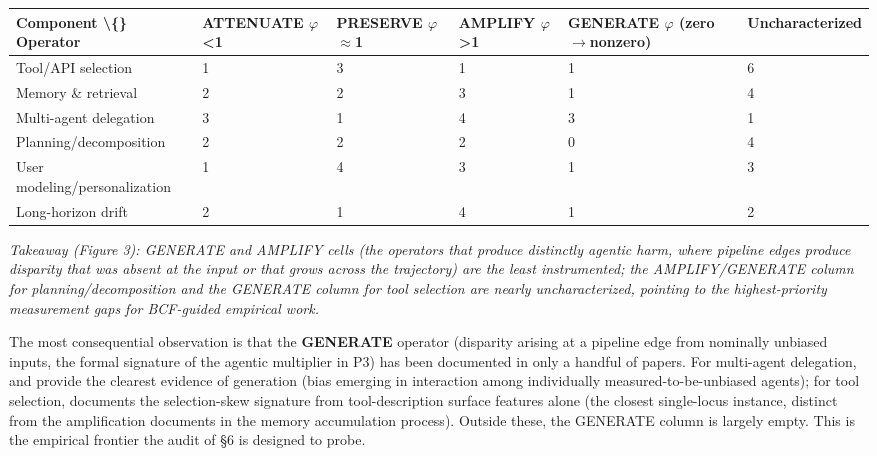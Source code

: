 \documentclass[10pt]{article}
\begin{document}
\begin{center}\footnotesize
\begin{longtable}{|p{}|p{}|p{}|p{}|p{}|p{}|}
\hline \textbf{Component \textbackslash\{\} Operator} & \textbf{ATTENUATE $\varphi$<1} & \textbf{PRESERVE $\varphi$$\approx$1} & \textbf{AMPLIFY $\varphi$>1} & \textbf{GENERATE $\varphi$ (zero$\rightarrow$nonzero)} & \textbf{Uncharacterized} \\ \hline\endhead
Tool/API selection & 1 & 3 & 1 & 1 & 6 \\ \hline
Memory \& retrieval & 2 & 2 & 3 & 1 & 4 \\ \hline
Multi-agent delegation & 3 & 1 & 4 & 3 & 1 \\ \hline
Planning/decomposition & 2 & 2 & 2 & 0 & 4 \\ \hline
User modeling/personalization & 1 & 4 & 3 & 1 & 3 \\ \hline
Long-horizon drift & 2 & 1 & 4 & 1 & 2 \\ \hline
\end{longtable}\end{center}

\emph{Takeaway (Figure 3): GENERATE and AMPLIFY cells (the operators that produce distinctly agentic harm, where pipeline edges produce disparity that was absent at the input or that grows across the trajectory) are the least instrumented; the AMPLIFY/GENERATE column for planning/decomposition and the GENERATE column for tool selection are nearly uncharacterized, pointing to the highest-priority measurement gaps for BCF-guided empirical work.}

The most consequential observation is that the \textbf{GENERATE} operator (disparity arising at a pipeline edge from nominally unbiased inputs, the formal signature of the agentic multiplier in P3) has been documented in only a handful of papers. For multi-agent delegation, \cite{nguyen2025social} and \cite{madigan2025emergent} provide the clearest evidence of generation (bias emerging in interaction among individually measured-to-be-unbiased agents); for tool selection, \cite{blankenstein2025biasbusters} documents the selection-skew signature from tool-description surface features alone (the closest single-locus instance, distinct from the amplification \cite{ma2026implicit} documents in the memory accumulation process). Outside these, the GENERATE column is largely empty. This is the empirical frontier the audit of \S{}6 is designed to probe.
\end{document}
